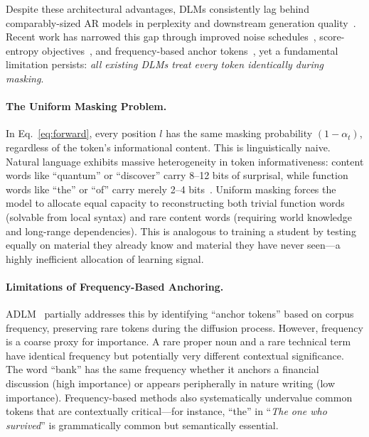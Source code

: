 \documentclass[11pt]{article}
\theoremstyle{remark}
\begin{document}
Despite these architectural advantages, DLMs consistently lag behind comparably-sized AR models in perplexity and downstream generation quality~\citep{mdlm,sedd,adlm}. Recent work has narrowed this gap through improved noise schedules~\citep{mdlm}, score-entropy objectives~\citep{sedd}, and frequency-based anchor tokens~\citep{adlm}, yet a fundamental limitation persists: \textit{all existing DLMs treat every token identically during masking}.

\paragraph{The Uniform Masking Problem.} In Eq.~\ref{eq:forward}, every position $l$ has the same masking probability $(1{-}\alpha_t)$, regardless of the token's informational content. This is linguistically naive. Natural language exhibits massive heterogeneity in token informativeness: content words like ``quantum'' or ``discover'' carry 8--12 bits of surprisal, while function words like ``the'' or ``of'' carry merely 2--4 bits~\citep{zipf1949human,shannon1948mathematical,shannon1951prediction}. Uniform masking forces the model to allocate equal capacity to reconstructing both trivial function words (solvable from local syntax) and rare content words (requiring world knowledge and long-range dependencies). This is analogous to training a student by testing equally on material they already know and material they have never seen---a highly inefficient allocation of learning signal.

\paragraph{Limitations of Frequency-Based Anchoring.} ADLM~\citep{adlm} partially addresses this by identifying ``anchor tokens'' based on corpus frequency, preserving rare tokens during the diffusion process. However, frequency is a coarse proxy for importance. A rare proper noun and a rare technical term have identical frequency but potentially very different contextual significance. The word ``bank'' has the same frequency whether it anchors a financial discussion (high importance) or appears peripherally in nature writing (low importance). Frequency-based methods also systematically undervalue common tokens that are contextually critical---for instance, ``the'' in ``\textit{The one who survived}'' is grammatically common but semantically essential.
\end{document}
